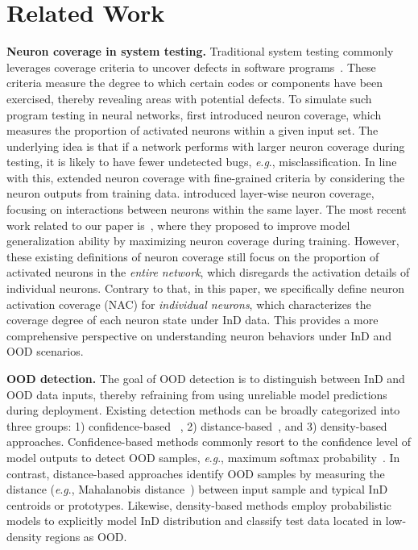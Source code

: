 \documentclass{article} \usepackage{iclr2024_conference,times}
\newcommand{\eg}{\textit{e}.\textit{g}.}
\newcommand{\bfstart}[1]{\noindent\textbf{#1.}}
\begin{document}
\section{Related Work}
\vspace{-1mm}
\bfstart{Neuron coverage in system testing} 
Traditional system testing commonly leverages coverage criteria to uncover defects in software programs~\citep{NACT_System:Traditional_Testing}. These criteria measure the degree to which certain codes or components have been exercised, thereby revealing areas with potential defects.
To simulate such program testing in neural networks, \citet{NACT_System:DeepXplore} first introduced neuron coverage, which measures the proportion of activated neurons within a given input set.
The underlying idea is that if a network performs with larger neuron coverage during testing, it is likely to have fewer undetected bugs, \eg, misclassification. 
In line with this, \citet{NACT_System:DeepGauge} extended neuron coverage with fine-grained criteria by considering the neuron outputs from training data. 
\citet{NACT_System:NLC} introduced layer-wise neuron coverage, focusing on interactions between neurons within the same layer.
The most recent work related to our paper is~\citet{NACT_DG:NeuronCoverage}, where they proposed to improve model generalization ability by maximizing neuron coverage during training. 
However, these existing definitions of neuron coverage still focus on the proportion of activated neurons in the \textit{entire network}, which disregards the activation details of individual neurons. 
Contrary to that, in this paper, we specifically define neuron activation coverage (NAC) for \textit{individual neurons}, which characterizes the coverage degree of each neuron state under InD data. This provides a more comprehensive perspective on understanding neuron behaviors under InD and OOD scenarios.











\vspace{-0.5mm}
\bfstart{OOD detection} 
The goal of OOD detection is to distinguish between InD and OOD data inputs, thereby refraining from using unreliable model predictions during deployment. 
Existing detection methods can be broadly categorized into three groups: 1) confidence-based ~\citep{ood_example1,OOD_Detect:MSP,OOD_Detect:MOS}, 2) distance-based~\citep{OOD_Detect:distance1,OOD_Detect:distance2,OOD_Detect:distance3}, and 3) density-based~\citep{OOD_Detect:density1,OOD_Detect:density2,OOD_Detect:density3} approaches. 
Confidence-based methods commonly resort to the confidence level of model outputs to detect OOD samples, \eg, maximum softmax probability~\citep{OOD_Detect:MSP}.
In contrast, distance-based approaches identify OOD samples by measuring the distance (\eg, Mahalanobis distance~\citep{OOD_Detect:Mahalanobis}) between input sample and typical InD centroids or prototypes. 
Likewise, density-based methods employ probabilistic models to explicitly model InD distribution and classify test data located in low-density regions as OOD.
\end{document}
